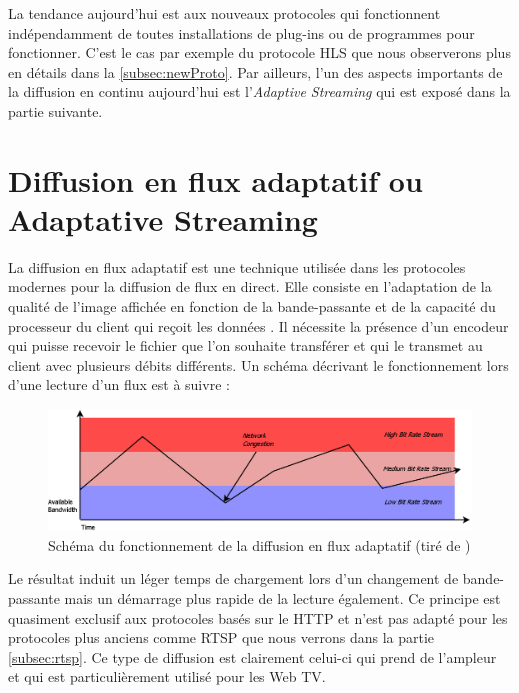 \documentclass{polytech/polytech}
\begin{document}
La tendance aujourd’hui est aux nouveaux protocoles qui fonctionnent indépendamment de toutes installations de plug-ins ou de programmes pour fonctionner. C’est le cas par exemple du protocole HLS que nous observerons plus en détails dans la \autoref{subsec:newProto}. Par ailleurs, l’un des aspects importants de la diffusion en continu aujourd’hui est l’\textit{Adaptive Streaming} qui est exposé dans la partie suivante.

\section{Diffusion en flux adaptatif ou Adaptative Streaming}
\label{sec:adaptative_streaming}

La diffusion en flux adaptatif est une technique utilisée dans les protocoles modernes pour la diffusion de flux en direct. Elle consiste en l’adaptation de la qualité de l’image affichée en fonction de la bande-passante et de la capacité du processeur du client qui reçoit les données \cite{_adaptive_2017}. Il nécessite la présence d’un encodeur qui puisse recevoir le fichier que l’on souhaite transférer et qui le transmet au client avec plusieurs débits différents. Un schéma décrivant le fonctionnement lors d’une lecture d’un flux est à suivre :

\begin{figure}
	\includegraphics[scale=0.25]{images/Adaptive_streaming_overview.png}
	\caption{Schéma du fonctionnement de la diffusion en flux adaptatif (tiré de \cite{_adaptive_2017})}
	\label{fig:adaptive_bitrate}
\end{figure}

Le résultat induit un léger temps de chargement lors d’un changement de bande-passante mais un démarrage plus rapide de la lecture également. Ce principe est quasiment exclusif aux protocoles basés sur le HTTP et n’est pas adapté pour les protocoles plus anciens comme RTSP que nous verrons dans la partie \autoref{subsec:rtsp}. Ce type de diffusion est clairement celui-ci qui prend de l’ampleur et qui est particulièrement utilisé pour les Web TV.
\end{document}
